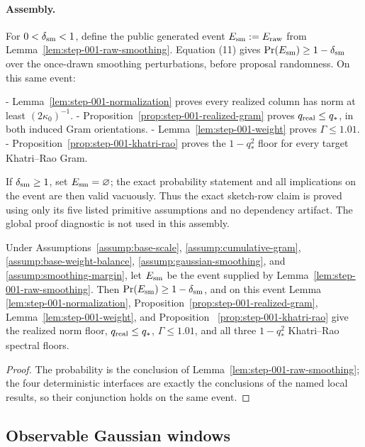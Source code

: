 \paragraph{Assembly.}

For $0<\delta_{\rm sm}<1$, define the public generated event
$E_{\rm sm}:=E_{\rm raw}$ from
Lemma~\ref{lem:step-001-raw-smoothing}. Equation (11) gives
$\Pr(E_{\rm sm})\ge1-\delta_{\rm sm}$ over the once-drawn smoothing
perturbations, before proposal randomness. On this same event:

- Lemma~\ref{lem:step-001-normalization} proves every realized column
  has norm at least $(2\kappa _0)^{-1}$.
- Proposition~\ref{prop:step-001-realized-gram} proves
  $q_{\rm real}\le q_*$, in both induced Gram orientations.
- Lemma~\ref{lem:step-001-weight} proves $\Gamma\le1.01$.
- Proposition~\ref{prop:step-001-khatri-rao} proves the
  $1-q_*^2$ floor for every target Khatri--Rao Gram.

If $\delta_{\rm sm}\ge1$, set $E_{\rm sm}=\varnothing$; the exact
probability statement and all implications on the event are then valid
vacuously. Thus the exact sketch-row claim is proved using only its five
listed primitive assumptions and no dependency artifact. The global proof
diagnostic is not used in this assembly.

\begin{proposition}\label{prop:step-001-geometry}
Under Assumptions~\ref{assump:base-scale},
\ref{assump:cumulative-gram}, \ref{assump:base-weight-balance},
\ref{assump:gaussian-smoothing}, and
\ref{assump:smoothing-margin}, let $E_{\rm sm}$ be the event supplied by
Lemma~\ref{lem:step-001-raw-smoothing}.  Then
$\Pr(E_{\rm sm})\ge1-\delta_{\rm sm}$, and on this event Lemma~
\ref{lem:step-001-normalization}, Proposition~\ref{prop:step-001-realized-gram},
Lemma~\ref{lem:step-001-weight}, and Proposition~
\ref{prop:step-001-khatri-rao} give the realized norm floor,
$q_{\rm real}\le q_*$, $\Gamma\le1.01$, and all three
$1-q_*^2$ Khatri--Rao spectral floors.
\begin{proof}
The probability is the conclusion of Lemma~\ref{lem:step-001-raw-smoothing};
the four deterministic interfaces are exactly the conclusions of the named
local results, so their conjunction holds on the same event.
\end{proof}
\end{proposition}


\subsection{Observable Gaussian windows}\label{app:step-002}

